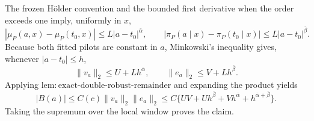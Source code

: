 The frozen Hölder convention and the bounded first derivative when the order exceeds one imply, uniformly in \(x\),
\[
|\mu_P(a,x)-\mu_P(t_0,x)|
\le L|a-t_0|^{\bar\alpha},
\qquad
|\pi_P(a\mid x)-\pi_P(t_0\mid x)|
\le L|a-t_0|^{\bar\beta}.
\]
Because both fitted pilots are constant in \(a\), Minkowski's inequality gives, whenever \(|a-t_0|\le h\),
\[
\|v_a\|_2\le U+Lh^{\bar\alpha},
\qquad
\|e_a\|_2\le V+Lh^{\bar\beta}.
\]
Applying \(\mathrm{lem:exact\text{-}double\text{-}robust\text{-}remainder}\) and expanding the product yields
\[
|B(a)|
\le C(c)\|v_a\|_2\|e_a\|_2
\le C\{UV+Uh^{\bar\beta}+Vh^{\bar\alpha}+h^{\bar\alpha+\bar\beta}\}.
\]
Taking the supremum over the local window proves the claim.